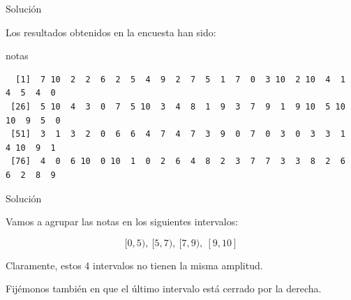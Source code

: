 \documentclass[
  ignorenonframetext,
]{beamer}
\newenvironment{Shaded}{\begin{snugshade}}{\end{snugshade}}
\newcommand{\NormalTok}[1]{#1}
\begin{document}
\begin{frame}[fragile]{Solución}
\protect\hypertarget{soluciuxf3n-15}{}

Los resultados obtenidos en la encuesta han sido:

\begin{Shaded}
\begin{Highlighting}[]
\NormalTok{notas}
\end{Highlighting}
\end{Shaded}

\begin{verbatim}
  [1]  7 10  2  2  6  2  5  4  9  2  7  5  1  7  0  3 10  2 10  4  1  4  5  4  0
 [26]  5 10  4  3  0  7  5 10  3  4  8  1  9  3  7  9  1  9 10  5 10 10  9  5  0
 [51]  3  1  3  2  0  6  6  4  7  4  7  3  9  0  7  0  3  0  3  3  1  4 10  9  1
 [76]  4  0  6 10  0 10  1  0  2  6  4  8  2  3  7  7  3  3  8  2  6  6  2  8  9
\end{verbatim}

\end{frame}

\begin{frame}{Solución}
\protect\hypertarget{soluciuxf3n-16}{}

Vamos a agrupar las notas en los siguientes intervalos:

\[[0,5),\ [5,7),\ [7,9),\ [9,10]\]

Claramente, estos 4 intervalos no tienen la misma amplitud.

Fijémonos también en que el último intervalo está cerrado por la
derecha.

\end{frame}
\end{document}
